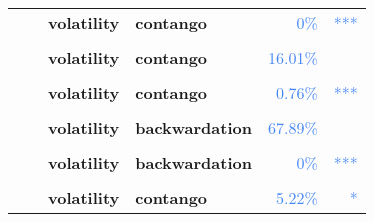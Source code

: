 \documentclass[
  authoryear,
  preprint,
  3p]{elsarticle}
\begin{document}
\begin{longtable}[t]{>{}l>{}l>{}l>{}l>{}r>{}r}
\textbf{} & \textbf{} & \textbf{volatility} & \textbf{contango} & \textcolor[HTML]{4285f4}{0\%} & \textcolor[HTML]{4285f4}{\vphantom{25} ***}\\
\addlinespace
\textbf{\cellcolor{gray!10}{}} & \textbf{\cellcolor{gray!10}{post-crisis}} & \textbf{\cellcolor{gray!10}{mean}} & \textbf{\cellcolor{gray!10}{backwardation}} & \textcolor[HTML]{4285f4}{\cellcolor{gray!10}{25.72\%}} & \textcolor[HTML]{4285f4}{\cellcolor{gray!10}{}}\\
\textbf{} & \textbf{} & \textbf{volatility} & \textbf{contango} & \textcolor[HTML]{4285f4}{16.01\%} & \textcolor[HTML]{4285f4}{}\\
\textbf{\cellcolor{gray!10}{Sugar-\#11 (IFUS)}} & \textbf{\cellcolor{gray!10}{past}} & \textbf{\cellcolor{gray!10}{mean}} & \textbf{\cellcolor{gray!10}{backwardation}} & \textcolor[HTML]{4285f4}{\cellcolor{gray!10}{24.1\%}} & \textcolor[HTML]{4285f4}{\cellcolor{gray!10}{}}\\
\textbf{} & \textbf{} & \textbf{volatility} & \textbf{contango} & \textcolor[HTML]{4285f4}{0.76\%} & \textcolor[HTML]{4285f4}{***}\\
\textbf{\cellcolor{gray!10}{}} & \textbf{\cellcolor{gray!10}{financialisation}} & \textbf{\cellcolor{gray!10}{mean}} & \textbf{\cellcolor{gray!10}{backwardation}} & \textcolor[HTML]{4285f4}{\cellcolor{gray!10}{75.29\%}} & \textcolor[HTML]{4285f4}{\cellcolor{gray!10}{}}\\
\addlinespace
\textbf{} & \textbf{} & \textbf{volatility} & \textbf{backwardation} & \textcolor[HTML]{4285f4}{67.89\%} & \textcolor[HTML]{4285f4}{}\\
\textbf{\cellcolor{gray!10}{}} & \textbf{\cellcolor{gray!10}{crisis}} & \textbf{\cellcolor{gray!10}{mean}} & \textbf{\cellcolor{gray!10}{contango}} & \textcolor[HTML]{4285f4}{\cellcolor{gray!10}{56.23\%}} & \textcolor[HTML]{4285f4}{\cellcolor{gray!10}{}}\\
\textbf{} & \textbf{} & \textbf{volatility} & \textbf{backwardation} & \textcolor[HTML]{4285f4}{0\%} & \textcolor[HTML]{4285f4}{\vphantom{1} ***}\\
\textbf{\cellcolor{gray!10}{}} & \textbf{\cellcolor{gray!10}{post-crisis}} & \textbf{\cellcolor{gray!10}{mean}} & \textbf{\cellcolor{gray!10}{contango}} & \textcolor[HTML]{4285f4}{\cellcolor{gray!10}{59.08\%}} & \textcolor[HTML]{4285f4}{\cellcolor{gray!10}{}}\\
\textbf{} & \textbf{} & \textbf{volatility} & \textbf{contango} & \textcolor[HTML]{4285f4}{5.22\%} & \textcolor[HTML]{4285f4}{*}\\

\end{longtable}
\end{document}
